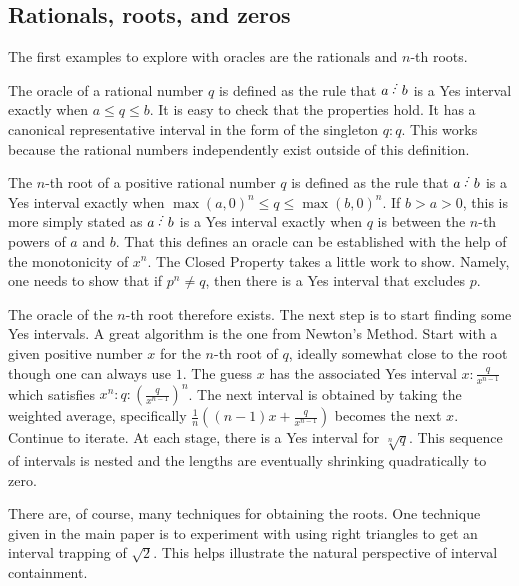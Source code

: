 \documentclass[12pt]{article}
\begin{document}
\subsection{Rationals, roots, and zeros}

The first examples to explore with oracles are the rationals and $n$-th roots. 

The oracle of a rational number $q$ is defined as the rule that $a\lte b$ is a Yes interval exactly when $a \leq q \leq b$. It is easy to check that the properties hold. It has a canonical representative interval in the form of the singleton $q:q$. This works because the rational numbers independently exist outside of this definition. 

The $n$-th root of a positive rational number $q$ is defined as the rule that $a\lte b$ is a Yes interval exactly when $\max(a, 0)^n \leq q \leq \max(b,0)^n$. If $b > a> 0$, this is more simply stated as $a\lte b$ is a Yes interval exactly when $q$ is between the $n$-th powers of $a$ and $b$. That this defines an oracle can be established with the help of the monotonicity of $x^n$. The Closed Property takes a little work to show. Namely, one needs to show that if $p^n \neq q$, then there is a Yes interval that excludes $p$. 

The oracle of the $n$-th root therefore exists. The next step is to start finding some Yes intervals. A great algorithm is the one from Newton's Method. Start with a given positive number $x$ for the $n$-th root of $q$, ideally somewhat close to the root though one can always use $1$. The guess $x$ has the associated Yes interval $x:\frac{q}{x^{n-1}}$ which satisfies $x^n : q : (\frac{q}{x^{n-1}})^n$. The next interval is obtained by taking the weighted average, specifically $\frac{1}{n}( (n-1) x + \frac{q}{x^{n-1}} )$ becomes the next $x$. Continue to iterate. At each stage, there is a Yes interval for $\sqrt[n]{q}$. This sequence of intervals is nested and the lengths are eventually shrinking quadratically to zero.  

There are, of course, many techniques for obtaining the roots. One technique given in the main paper is to experiment with using right triangles to get an interval trapping of $\sqrt{2}$. This helps illustrate the natural perspective of interval containment.  
\end{document}
